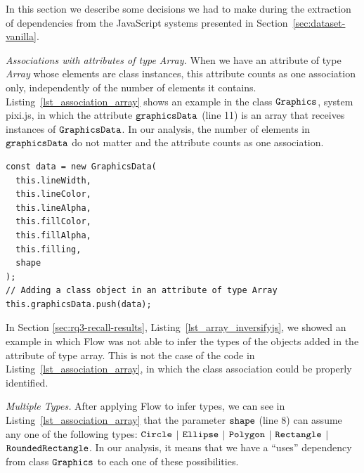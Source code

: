 \documentclass[review]{elsarticle}
\newcommand{\aspas}[1]{{``#1''}}
\newcommand{\mcode}[1]{$\tt #1$}
\begin{document}
In this section we describe some decisions we had to make during the extraction of dependencies from the JavaScript systems presented in Section~\ref{sec:dataset-vanilla}. 

\vspace{2.0 mm}

\noindent \textit{Associations with attributes of type Array.} When we have an attribute of type \textit{Array} whose elements are class instances, this attribute counts as one association only, independently of the number of elements it contains. Listing~\ref{lst_association_array} shows an example in the class \mcode{Graphics}, system {\sc pixi.js}, in which the attribute \mcode{graphicsData} (line 11) is an array that receives instances of \mcode{GraphicsData}. In our analysis, the number of elements in \mcode{graphicsData} do not matter and the attribute counts as one association.

\begin{lstlisting}[caption=Example of association in class \mcode{Graphics} in system {\sc pixi.js}, label=lst_association_array, emph={[2]graphicsData},emphstyle={[2]\ttfamily\bfseries\color{darkgreen}}]
const data = new GraphicsData(
  this.lineWidth,
  this.lineColor,
  this.lineAlpha,
  this.fillColor,
  this.fillAlpha,
  this.filling,
  shape
);
// Adding a class object in an attribute of type Array
this.graphicsData.push(data);

\end{lstlisting} 

\vspace{1.0 mm}

In Section \ref{sec:rq3-recall-results}, Listing~\ref{lst_array_inversifyjs}, we showed an example in which Flow was not able to infer the types of the objects added in the attribute of type array. This is not the case of the code in Listing~\ref{lst_association_array}, in which the class association could be properly identified.

\vspace{2.5 mm}

\noindent \textit{Multiple Types.} After applying Flow to infer types, we can see in Listing~\ref{lst_association_array} that the parameter \mcode{shape} (line 8) can assume any one of the following types:  \mcode{Circle} $\vert$ \mcode{Ellipse} $\vert$ \mcode{Polygon} $\vert$ \mcode{Rectangle} $\vert$ \mcode{RoundedRectangle}. In our analysis, it means that we have a \aspas{uses} dependency from class \mcode{Graphics} to each one of these possibilities.
\end{document}
